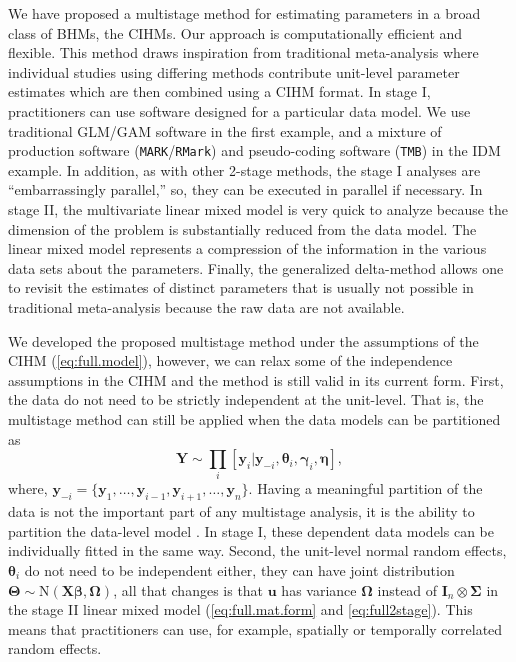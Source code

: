 \documentclass[12pt]{article}
\newcommand{\by}{\mathbf{y}}
\newcommand{\bt}{\boldsymbol{\theta}}
\newcommand{\bb}{\boldsymbol{\beta}}
\newcommand{\bn}{\boldsymbol{\eta}}
\newcommand{\bT}{\boldsymbol{\Theta}}
\newcommand{\bg}{\boldsymbol{\gamma}}
\newcommand{\bSig}{\boldsymbol{\Sigma}}
\newcommand{\bO}{\boldsymbol{\Omega}}
\newcommand{\bX}{\mathbf{X}}
\newcommand{\bu}{\mathbf{u}}
\newcommand{\tN}{\text{N}}
\newcommand{\bY}{\mathbf{Y}}
\newcommand{\bI}{\mathbf{I}}
\begin{document}
We have proposed a multistage method for estimating parameters in a broad class of BHMs, the CIHMs. Our approach is computationally efficient and flexible. This method draws inspiration from traditional meta-analysis where individual studies using differing methods contribute unit-level parameter estimates which are then combined using a CIHM format. In stage I, practitioners can use software designed for a particular data model. We use traditional GLM/GAM software in the first example, and a mixture of production software ({\tt MARK}/{\tt RMark}) and pseudo-coding software ({\tt TMB}) in the IDM example. In addition, as with other 2-stage methods, the stage I analyses are ``embarrassingly parallel,'' so, they can be executed in parallel if necessary. In stage II, the multivariate linear mixed model is very quick to analyze because the dimension of the problem is substantially reduced from the data model. The linear mixed model represents a compression of the information in the various data sets about the parameters. Finally, the generalized delta-method allows one to revisit the estimates of distinct parameters that is usually not possible in traditional meta-analysis because the raw data are not available.  

We developed the proposed multistage method under the assumptions of the CIHM (\ref{eq:full.model}), however, we  can relax some of the independence assumptions in the CIHM and the method is still valid in its current form. First, the data do not need to be strictly independent at the unit-level. That is, the multistage method can still be applied when the data models can be partitioned as
\[
\bY \sim \prod_i[\by_i|\by_{-i}, \bt_i, \bg_i, \bn],
\]
where, $\by_{-i} = \{\by_1,\dots,\by_{i-1},\by_{i+1},\dots,\by_n\}$. Having a meaningful partition of the data is not the important part of any multistage analysis, it is the ability to partition the data-level model \citep{hooten2018prior}. In stage I, these dependent data models can be individually fitted in the same way. Second, the unit-level normal random effects, $\bt_i$ do not need to be independent either, they can have joint distribution $\bT  \sim \tN(\bX\bb, \bO)$, all that changes is that $\bu$ has variance $\bO$ instead of $\bI_n \otimes \bSig$ in the stage II linear mixed model (\ref{eq:full.mat.form} and \ref{eq:full2stage}). This means that practitioners can use, for example, spatially or temporally correlated random effects. 
\end{document}

